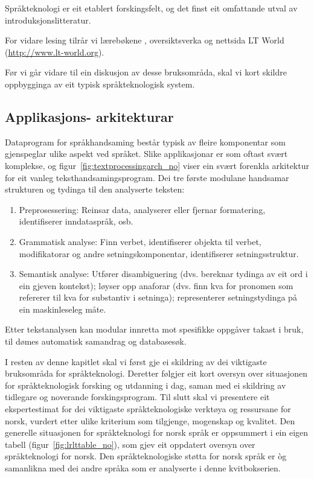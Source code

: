 \begin{multicols}{2}
Språkteknologi er eit etablert forskingsfelt, og det finst eit omfattande utval av introduksjonslitteratur.

For vidare lesing tilrår vi lærebøkene \cite{jurafsky-martin01, manning-schuetze1}, oversiktsverka \cite{lt-survey1} og nettsida LT World (\url{http://www.lt-world.org}).

Før vi går vidare til ein diskusjon av desse bruksområda, skal vi kort skildre oppbygginga av eit typisk språkteknologisk system. 

\subsection[Applikasjonsarkitekturar]{Applikasjons- arkitekturar}

Dataprogram for språkhandsaming består typisk av fleire komponentar som gjenspeglar ulike aspekt ved språket. Slike applikasjonar er som oftast svært komplekse, og figur~\ref{fig:textprocessingarch_no} viser ein svært forenkla arkitektur for eit vanleg teksthandsamingsprogram. Dei tre første modulane handsamar strukturen og tydinga til den analyserte teksten:

\begin{enumerate}
\item Preprosessering: Reinsar data, analyserer eller fjernar formatering, identifiserer inndataspråk, osb. 
\item Grammatisk analyse: Finn verbet, identifiserer objekta til verbet, modifikatorar og andre setningskomponentar, identifiserer setningsstruktur. 
\item Semantisk analyse: Utfører disambiguering (dvs. bereknar tydinga av eit ord i ein gjeven kontekst); løyser opp anaforar (dvs. finn kva for pronomen som refererer til kva for substantiv i setninga); representerer setningstydinga på ein maskinleseleg måte.
\end{enumerate}

Etter tekstanalysen kan modular innretta mot spesifikke oppgåver takast i bruk, til dømes automatisk samandrag og databasesøk. 

I resten av denne kapitlet skal vi først gje ei skildring av dei viktigaste bruksområda for språkteknologi. Deretter følgjer eit kort oversyn over situasjonen for språkteknologisk forsking og utdanning i dag, saman med ei skildring av tidlegare og noverande forskingsprogram. Til slutt skal vi presentere eit ekspertestimat for dei viktigaste språkteknologiske verktøya og ressursane for norsk, vurdert etter ulike kriterium som tilgjenge, mogenskap og kvalitet. Den generelle situasjonen for språkteknologi for norsk språk er oppsummert i ein eigen tabell (figur~\ref{fig:lrlttable_no}), som gjev eit oppdatert oversyn over språkteknologi for norsk. Den språkteknologiske støtta for norsk språk er òg samanlikna med dei andre språka som er analyserte i denne kvitbokserien. 


\end{multicols}
